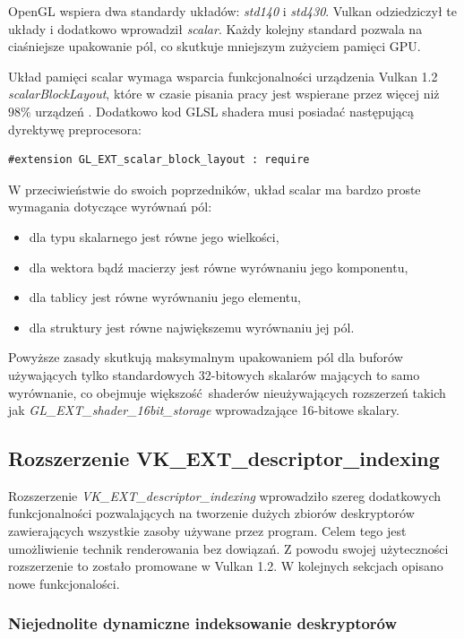 OpenGL wspiera dwa standardy układów: \textit{std140} i \textit{std430}.
Vulkan odziedziczył te układy i dodatkowo wprowadził \textit{scalar}.
Każdy kolejny standard pozwala na ciaśniejsze upakowanie pól, co skutkuje mniejszym zużyciem pamięci GPU.

Układ pamięci scalar wymaga wsparcia funkcjonalności urządzenia Vulkan 1.2 \textit{scalarBlockLayout}, które w czasie pisania pracy jest wspierane przez więcej niż $98\%$ urządzeń \cite{GPUINFO}.
Dodatkowo kod GLSL shadera musi posiadać następującą dyrektywę preprocesora:
\lstset{language=GLSL}
\begin{lstlisting}[caption={Dyrektywa preprocesora dla układu pamięci skalar},captionpos=b]
#extension GL_EXT_scalar_block_layout : require
\end{lstlisting}

W przeciwieństwie do swoich poprzedników, układ scalar ma bardzo proste wymagania dotyczące wyrównań pól:
\begin{itemize}
	\item dla typu skalarnego jest równe jego wielkości,
	\item dla wektora bądź macierzy jest równe wyrównaniu jego komponentu,
	\item dla tablicy jest równe wyrównaniu jego elementu,
	\item dla struktury jest równe największemu wyrównaniu jej pól.
\end{itemize}
Powyższe zasady skutkują maksymalnym upakowaniem pól dla buforów używających tylko standardowych 32-bitowych skalarów mających to samo wyrównanie, co obejmuje większość shaderów nieużywających rozszerzeń takich jak \textit{GL\_EXT\_shader\_16bit\_storage} wprowadzające 16-bitowe skalary.


\subsection{Rozszerzenie VK\_EXT\_descriptor\_indexing}

Rozszerzenie \textit{VK\_EXT\_descriptor\_indexing} wprowadziło szereg dodatkowych funkcjonalności pozwalających na tworzenie dużych zbiorów
deskryptorów zawierających wszystkie zasoby używane przez program.
Celem tego jest umożliwienie technik renderowania bez dowiązań. Z powodu swojej użyteczności rozszerzenie to zostało promowane w Vulkan 1.2.
W kolejnych sekcjach opisano nowe funkcjonalości.

\subsubsection{Niejednolite dynamiczne indeksowanie deskryptorów}

